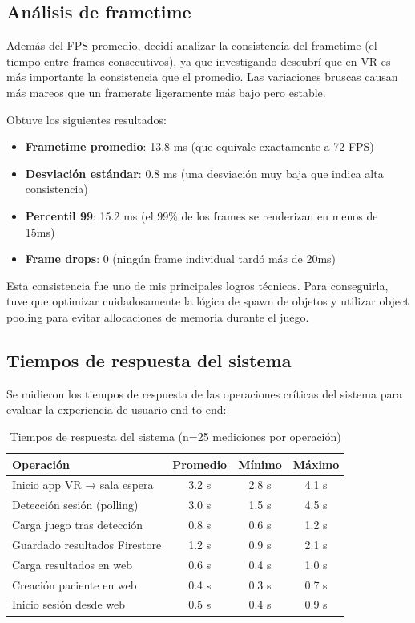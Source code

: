 \subsection{Análisis de frametime}

Además del FPS promedio, decidí analizar la consistencia del frametime (el tiempo entre frames consecutivos), ya que investigando descubrí que en VR es más importante la consistencia que el promedio. Las variaciones bruscas causan más mareos que un framerate ligeramente más bajo pero estable.

Obtuve los siguientes resultados:

\begin{itemize}
    \item \textbf{Frametime promedio}: 13.8 ms (que equivale exactamente a 72 FPS)
    \item \textbf{Desviación estándar}: 0.8 ms (una desviación muy baja que indica alta consistencia)
    \item \textbf{Percentil 99}: 15.2 ms (el 99\% de los frames se renderizan en menos de 15ms)
    \item \textbf{Frame drops}: 0 (ningún frame individual tardó más de 20ms)
\end{itemize}

Esta consistencia fue uno de mis principales logros técnicos. Para conseguirla, tuve que optimizar cuidadosamente la lógica de spawn de objetos y utilizar object pooling para evitar allocaciones de memoria durante el juego.

\subsection{Tiempos de respuesta del sistema}

Se midieron los tiempos de respuesta de las operaciones críticas del sistema para evaluar la experiencia de usuario end-to-end:

\begin{table}[h]
\centering
\begin{tabular}{|l|c|c|c|}
\hline
\textbf{Operación} & \textbf{Promedio} & \textbf{Mínimo} & \textbf{Máximo} \\ \hline
Inicio app VR → sala espera & 3.2 s & 2.8 s & 4.1 s \\ \hline
Detección sesión (polling) & 3.0 s & 1.5 s & 4.5 s \\ \hline
Carga juego tras detección & 0.8 s & 0.6 s & 1.2 s \\ \hline
Guardado resultados Firestore & 1.2 s & 0.9 s & 2.1 s \\ \hline
Carga resultados en web & 0.6 s & 0.4 s & 1.0 s \\ \hline
Creación paciente en web & 0.4 s & 0.3 s & 0.7 s \\ \hline
Inicio sesión desde web & 0.5 s & 0.4 s & 0.9 s \\ \hline
\end{tabular}
\caption{Tiempos de respuesta del sistema (n=25 mediciones por operación)}
\label{tab:tiempos}
\end{table}

